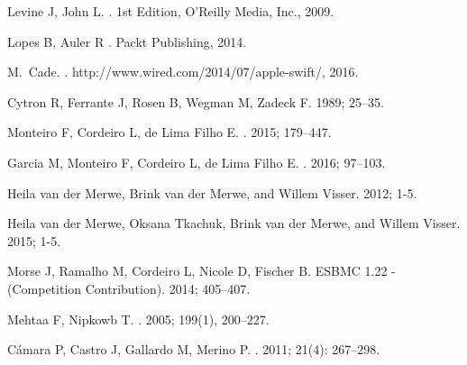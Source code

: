 \documentclass[times, doublespace]{cpeauth}
\begin{document}
\begin{thebibliography}{99}
Levine J, John L.
.
\newblock 1st Edition, O'Reilly Media, Inc., 2009.

Lopes B, Auler R 
. 
\newblock Packt Publishing, 2014.

M.~Cade. 
.
\newblock http://www.wired.com/2014/07/apple-swift/, 2016.

Cytron R, Ferrante J, Rosen B, Wegman M, Zadeck F. 
 1989; 25--35.

Monteiro F, Cordeiro L, de Lima Filho E. 
. 
 2015; 179--447.

Garcia M, Monteiro F, Cordeiro L, de Lima Filho E. 
. 
 2016; 97--103.

Heila van der Merwe, Brink van der Merwe, and Willem Visser.
 2012; 1-5.

Heila van der Merwe, Oksana Tkachuk, Brink van der Merwe, and Willem Visser.
 2015; 1-5.

Morse J, Ramalho M, Cordeiro L, Nicole D, Fischer B.
\newblock ESBMC 1.22 - (Competition Contribution).
 2014; 405--407.

Mehtaa F, Nipkowb T.
.
 2005; 199(1), 200--227.

C\'amara P, Castro J, Gallardo M, Merino P.
.
 2011; 21(4): 267--298.


\end{thebibliography}
\end{document}
